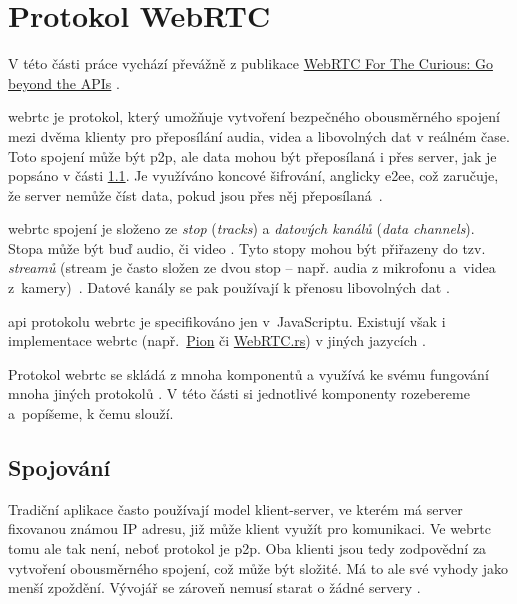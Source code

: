 \section{Protokol WebRTC}\label{webRTC}

V této části práce vychází převážně z publikace
\href{https://webrtcforthecurious.com/}{WebRTC For The Curious: Go beyond the
    APIs} \parencite{WebRTCForTheCurious}.

\gls{webrtc} je protokol, který umožňuje vytvoření bezpečného obousměrného
spojení mezi dvěma klienty pro přeposílání audia, videa a libovolných dat v
reálném čase. Toto spojení může být \gls{p2p}, ale data mohou být přeposílaná i
přes server, jak je popsáno v části \ref{connecting}. Je využíváno koncové
šifrování, anglicky \gls{e2ee}, což zaručuje, že server nemůže číst data, pokud
jsou přes něj přeposílaná~\parencite{WebRTCForTheCurious}.

\gls{webrtc} spojení je složeno ze \textit{stop} (\textit{tracks}) a
\textit{datových kanálů} (\textit{data channels}). Stopa může být buď audio, či
video \parencite{MDN-WebRTC-MediaStreamTrack}. Tyto stopy mohou být přiřazeny do
tzv. \textit{streamů} (stream je často složen ze dvou stop -- např. audia z
mikrofonu a~videa z~kamery)~\parencite{MDN-WebRTC-MediaStream}. Datové kanály se
pak používají k přenosu libovolných dat
\parencite{WebRTCORG-GettingStarted-DataChannels}.

\gls{api} protokolu \gls{webrtc} je specifikováno jen v~JavaScriptu. Existují
však i implementace \gls{webrtc}
(např.~\href{https://github.com/pion/webrtc}{Pion} či
\href{https://github.com/webrtc-rs/webrtc}{WebRTC.rs}) v jiných jazycích
\parencite{WebRTCForTheCurious,GitHub-Pion-WebRTC,GitHub-WebRTCRS-WebRTC}.

Protokol \gls{webrtc} se skládá z mnoha komponentů a využívá ke svému fungování
mnoha jiných protokolů \parencite{WebRTCForTheCurious}. V této části si
jednotlivé komponenty rozebereme a~popíšeme, k čemu slouží.

\subsection{Spojování}\label{connecting}

Tradiční aplikace často používají model klient-server, ve kterém má server
fixovanou známou IP adresu, již může klient využít pro komunikaci. Ve
\gls{webrtc} tomu ale tak není, neboť protokol je \gls{p2p}. Oba klienti jsou
tedy zodpovědní za vytvoření obousměrného spojení, což může být složité. Má to
ale své vyhody jako menší zpoždění. Vývojář se zároveň nemusí starat o žádné
servery \parencite{WebRTCForTheCurious}.

